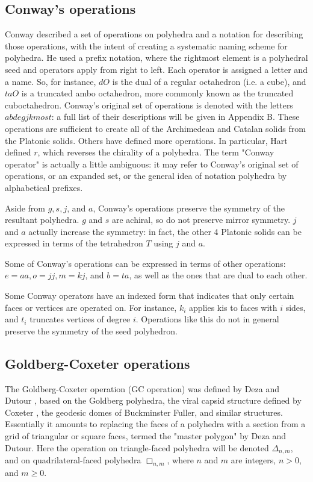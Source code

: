 \documentclass{amsart}[12pt]
\begin{document}
\subsection{Conway's operations}
Conway described a set of operations on polyhedra and a notation for describing
those operations, with the intent of creating a systematic naming scheme for
polyhedra.\cite{conway} He used a prefix notation, where the rightmost element
is a polyhedral seed and operators apply from right to left. Each operator is
assigned a letter and a name. So, for instance, $dO$ is the dual of a regular
octahedron (i.e. a cube), and $taO$ is a truncated ambo octahedron, more
commonly known as the truncated cuboctahedron. Conway's original set of
operations is denoted with the letters $abdegjkmost$: a full list of their
descriptions will be given in Appendix B. These operations are sufficient to
create all of the Archimedean and Catalan solids from the Platonic solids.
Others have defined more operations.
\cite{hart98}\cite{hart00}\cite{antiprism} In particular, Hart \cite{hart98}
defined $r$, which reverses the chirality of a polyhedra. The term "Conway
operator" is actually a little ambiguous: it may refer to Conway's original
set of operations, or an expanded set, or the general idea of notation
polyhedra by alphabetical prefixes.

Aside from $g, s, j$, and $a$, Conway's operations preserve the
symmetry of the resultant polyhedra. $g$ and $s$ are achiral, so
do not preserve mirror symmetry. $j$ and $a$ actually increase
the symmetry: in fact, the other 4 Platonic solids can be expressed
in terms of the tetrahedron $T$ using $j$ and $a$.

Some of Conway's operations can be expressed in terms of other operations:
$e=aa, o=jj, m=kj$, and $b=ta$, as well as the ones that are dual to each other.

Some Conway operators have an indexed form that indicates that only certain faces or
vertices are operated on. For instance, $k_i$ applies kis to faces with
$i$ sides, and $t_i$ truncates vertices of degree $i$.
Operations like this do not in general preserve the symmetry of the seed
polyhedron.

\subsection{Goldberg-Coxeter operations}
The Goldberg-Coxeter operation (GC operation) was defined by Deza and Dutour
\cite{dutour}, based on the Goldberg polyhedra, the viral capsid structure
defined by Coxeter \cite{coxeter71}, the geodesic domes of Buckminster Fuller,
and similar structures. Essentially it amounts to replacing the faces of a
polyhedra with a section from a grid of triangular or square faces, termed the
"master polygon" by Deza and Dutour. Here the operation on triangle-faced
polyhedra will be denoted $\Delta_{n,m}$, and on quadrilateral-faced polyhedra
$\Box_{n,m}$, where $n$ and $m$ are integers, $n > 0$, and $m \ge 0$.
\end{document}

